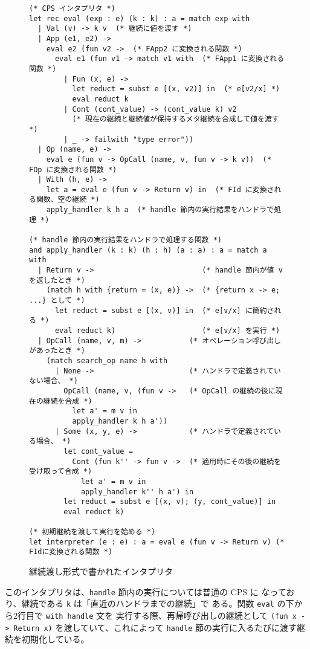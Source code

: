 \begin{figure}
\begin{spacing}{0.9}
\begin{verbatim}
(* CPS インタプリタ *)
let rec eval (exp : e) (k : k) : a = match exp with
  | Val (v) -> k v  (* 継続に値を渡す *)
  | App (e1, e2) ->
    eval e2 (fun v2 ->  (* FApp2 に変換される関数 *)
      eval e1 (fun v1 -> match v1 with  (* FApp1 に変換される関数 *)
        | Fun (x, e) ->
          let reduct = subst e [(x, v2)] in  (* e[v2/x] *)
          eval reduct k
        | Cont (cont_value) -> (cont_value k) v2
          (* 現在の継続と継続値が保持するメタ継続を合成して値を渡す *)
        | _ -> failwith "type error"))
  | Op (name, e) ->
    eval e (fun v -> OpCall (name, v, fun v -> k v))  (* FOp に変換される関数 *)
  | With (h, e) ->
    let a = eval e (fun v -> Return v) in  (* FId に変換される関数、空の継続 *)
    apply_handler k h a  (* handle 節内の実行結果をハンドラで処理 *)

(* handle 節内の実行結果をハンドラで処理する関数 *)
and apply_handler (k : k) (h : h) (a : a) : a = match a with
  | Return v ->                         (* handle 節内が値 v を返したとき *)
    (match h with {return = (x, e)} ->  (* {return x -> e; ...} として *)
      let reduct = subst e [(x, v)] in  (* e[v/x] に簡約される *)
      eval reduct k)                    (* e[v/x] を実行 *)
  | OpCall (name, v, m) ->           (* オペレーション呼び出しがあったとき *)
    (match search_op name h with
      | None ->                      (* ハンドラで定義されていない場合、 *)
        OpCall (name, v, (fun v ->   (* OpCall の継続の後に現在の継続を合成 *)
          let a' = m v in
          apply_handler k h a'))
      | Some (x, y, e) ->            (* ハンドラで定義されている場合、 *)
        let cont_value =
          Cont (fun k'' -> fun v ->  (* 適用時にその後の継続を受け取って合成 *)
            let a' = m v in
            apply_handler k'' h a') in
        let reduct = subst e [(x, v); (y, cont_value)] in
        eval reduct k)

(* 初期継続を渡して実行を始める *)
let interpreter (e : e) : a = eval e (fun v -> Return v) (* FIdに変換される関数 *)
\end{verbatim}
\caption{継続渡し形式で書かれたインタプリタ}
\label{figure:1cps}
\end{spacing}
\end{figure}

このインタプリタは、\texttt{handle} 節内の実行については普通の CPS に
なっており、継続である \texttt{k} は「直近のハンドラまでの継続」で
ある。関数 \texttt{eval} の下から2行目で \texttt{with handle} 文を
実行する際、再帰呼び出しの継続として
\texttt{(fun x -> Return x)} を渡していて、これによって
\texttt{handle} 節の実行に入るたびに渡す継続を初期化している。


